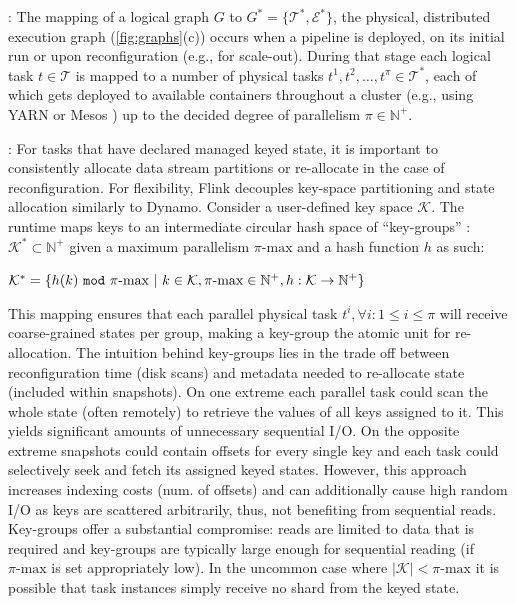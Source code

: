 : The mapping of a logical graph $G$ to $G^* = \{\mathcal{T^*}, \mathcal{E^*}\}$, the physical, distributed execution graph (\autoref{fig:graphs}(c)) occurs when a pipeline is deployed, on its initial run or upon reconfiguration (e.g., for scale-out). During that stage each logical task $t \in \mathcal{T}$ is mapped to a number of physical tasks $t^1, t^2, \ldots, t^\pi \in \mathcal{T^*}$, each of which gets deployed to available containers throughout a cluster (e.g., using YARN \cite{vavilapalli2013apache} or Mesos \cite{hindman2011mesos}) up to the decided degree of parallelism $\pi \in \mathbb{N^+}$. 

: For tasks that have declared managed keyed state, it is important to consistently allocate data stream partitions or re-allocate in the case of reconfiguration. For flexibility, Flink decouples key-space partitioning and state allocation similarly to Dynamo\cite{decandia2007dynamo}. Consider a user-defined key space $\mathcal{K}$. The runtime maps keys to an intermediate circular hash space of ``key-groups'' : $\mathcal{K}^* \subset \mathbb{N^+}$ given a maximum parallelism $\pi\text{-max}$ and a hash function $h$ as such:

\noindent $\mathcal{K}^* = \{ h(k)\text{ \texttt{mod} }\pi\text{-max}\text{ }|\text{ }k \in \mathcal{K}, \pi\text{-max} \in \mathbb{N^+}, h: \mathcal{K} \rightarrow \mathbb{N^+} \}$

\noindent This mapping ensures that each parallel physical task $t^i , \forall i : 1 \leq i \leq \pi$ will receive coarse-grained states per group, making a key-group the atomic unit for re-allocation. The intuition behind key-groups lies in the trade off between reconfiguration time (disk scans) and metadata needed to re-allocate state (included within snapshots). On one extreme each parallel task could scan the whole state (often remotely) to retrieve the values of all keys assigned to it. This yields significant amounts of unnecessary sequential I/O. On the opposite extreme snapshots could contain offsets for every single key and each task could selectively seek and fetch its assigned keyed states. However, this approach increases indexing costs (num. of offsets) and can additionally cause high random I/O as keys are scattered arbitrarily, thus, not benefiting from sequential reads. Key-groups offer a substantial compromise: reads are limited to data that is required and key-groups are typically large enough for sequential reading (if $\pi\text{-max}$ is set appropriately low). In the uncommon case where $|\mathcal{K}| < \pi\text{-max}$ it is possible that task instances simply receive no shard from the keyed state.

